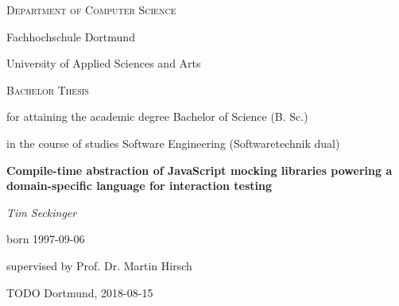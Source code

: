 {\centering
  {\small\scshape Department of Computer Science \par}
  {\large Fachhochschule Dortmund \par}
  {\large University of Applied Sciences and Arts \par}

  \vspace{10mm}

  {\large\scshape Bachelor Thesis\par}
  \vspace{5mm}
  {\small
  for attaining the academic degree Bachelor of Science (B. Sc.)\par
  in the course of studies Software Engineering (Softwaretechnik dual)\par
  }

  \vspace{20mm}

  {\huge\bfseries
    Compile-time abstraction of JavaScript mocking libraries
    powering a domain-specific language for interaction testing
  \par}

  \vspace{20mm}

  {\large\itshape
  Tim Seckinger\par
  \small born 1997-09-06\par
  }
  \vspace{5mm}
  {\small supervised by Prof. Dr. Martin Hirsch\par}

  \vfill

  {\large TODO Dortmund, 2018-08-15}
}
